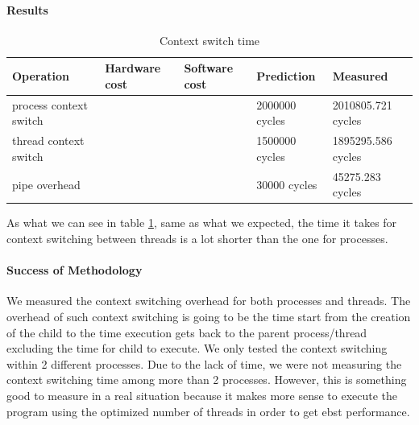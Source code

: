 \paragraph{Results}
\begin{table}
\begin{center}
\begin{tabular}{| l | l | l | l | l |}
\hline

Operation 				& Hardware cost 	& Software cost 	& Prediction 	& Measured \\ \hline

process context switch 	& 				&				&2000000 cycles	& 2010805.721 cycles \\
\hline
thread context switch 	& 				&				&1500000 cycles	& 1895295.586 cycles \\ 
\hline
pipe overhead			& 				&				&30000 cycles	& 45275.283 cycles \\ 
\hline
\hline
\end{tabular}
\end{center}

\caption{Context switch time\label{tab:context-switch-time}}
\end{table}
As what we can see in table \ref{tab:context-switch-time}, same as what we expected, the time it takes for context switching between threads is a lot shorter than the one for processes.

\paragraph{Success of Methodology}
We measured the context switching overhead for both processes and threads. The overhead of such context switching is going to be the time start from the creation of the child to the time execution gets back to the parent process/thread excluding the time for child to execute. We only tested the context switching within 2 different processes. Due to the lack of time, we were not measuring the context switching time among more than 2 processes. However, this is something good to measure in a real situation because it makes more sense to execute the program using the optimized number of threads in order to get ebst performance.



